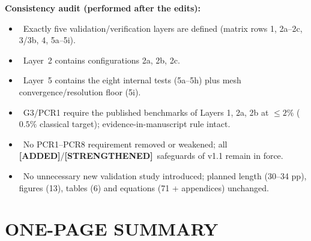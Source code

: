 \documentclass[11pt,a4paper]{article}
\newcommand{\ADDED}{{\color{addcol}\textbf{[ADDED]}}}
\newcommand{\STR}{{\color{strcol}\textbf{[STRENGTHENED]}}}
\newcommand{\YES}{\textcolor{ok}{\textbf{\checkmark}}}
\begin{document}
\medskip
\textbf{Consistency audit (performed after the edits):}
\begin{itemize}
\item \YES\ Exactly five validation/verification layers are defined (matrix rows 1, 2a--2c, 3/3b, 4, 5a--5i).
\item \YES\ Layer~2 contains configurations 2a, 2b, 2c.
\item \YES\ Layer~5 contains the eight internal tests (5a--5h) plus mesh convergence/resolution floor (5i).
\item \YES\ G3/PCR1 require the published benchmarks of Layers 1, 2a, 2b at $\le2\%$ ($0.5\%$ classical target); evidence-in-manuscript rule intact.
\item \YES\ No PCR1--PCR8 requirement removed or weakened; all \ADDED/\STR\ safeguards of v1.1 remain in force.
\item \YES\ No unnecessary new validation study introduced; planned length (30--34 pp), figures (13), tables (6) and equations (71 + appendices) unchanged.
\end{itemize}

\section*{\color{lockblue}ONE-PAGE SUMMARY}
\end{document}

